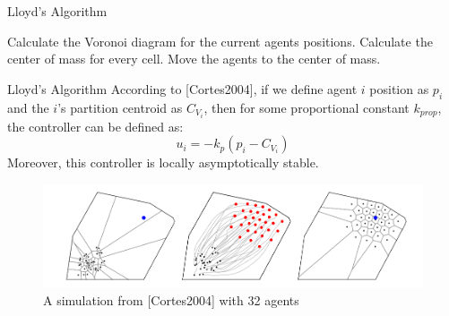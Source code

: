 \documentclass[t]{beamer}
\begin{document}

\begin{frame}[label=lloydsalg2]{Lloyd's Algorithm}
\begin{algorithm}[H]
\caption{Lloyd's Algorithm \footnote{Lloyd, S., “Least squares quantization in PCM,” IEEE Transactions on Information Theory, Information Theory, IEEE Transactions on, IEEE Trans. Inform. Theory, Vol. 28, No. 2, 1982, pp. 129–137, doi:10.1109/TIT.1982.1056489}.}\label{LloydAlgo}
\begin{algorithmic}[1]
\State Calculate the Voronoi diagram for the current agents positions.
\State Calculate the center of mass for every cell.
\State Move the agents to the center of mass.
\end{algorithmic}
\end{algorithm}
\end{frame}

\begin{frame}[label=lloydsalg3]{Lloyd's Algorithm}
According to [Cortes2004], if we define agent $i$ position as $p_i$ and the $i$'s partition centroid as $C_{V_{i}}$, then for some proportional constant $k_{prop}$, the controller can be defined as:
\begin{equation} \label{Lloyds contoller}
u_{i} = -k_{p}\left( p_i - C_{V_{i}} \right)
\end{equation} 
Moreover, this controller is locally asymptotically stable.

\begin{figure}[b]
\centering
\includegraphics[scale=0.3]{Lloyds-alg-from-cortes.png}
\caption{A simulation from [Cortes2004] with 32 agents}
\end{figure}
\end{frame}
\end{document}
